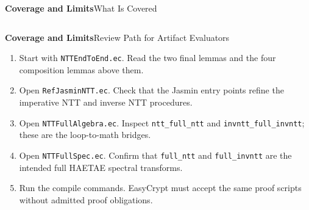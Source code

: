 \documentclass[10pt,aspectratio=1610,compress,dvipsnames]{beamer}
\newcommand{\ec}[1]{\texttt{#1}}
\begin{document}
\begin{frame}{\bfseries Coverage and Limits}{What Is Covered}
\begin{columns}[T]

\end{columns}
\end{frame}

\begin{frame}{\bfseries Coverage and Limits}{Review Path for Artifact Evaluators}
\begin{enumerate}
  \setlength\itemsep{9pt}
  \item Start with \ec{NTTEndToEnd.ec}.  Read the two final lemmas and the four composition lemmas above them.
  \item Open \ec{RefJasminNTT.ec}.  Check that the Jasmin entry points refine the imperative NTT and inverse NTT procedures.
  \item Open \ec{NTTFullAlgebra.ec}.  Inspect \ec{ntt\_full\_ntt} and \ec{invntt\_full\_invntt}; these are the loop-to-math bridges.
  \item Open \ec{NTTFullSpec.ec}.  Confirm that \ec{full\_ntt} and \ec{full\_invntt} are the intended full HAETAE spectral transforms.
  \item Run the compile commands.  EasyCrypt must accept the same proof scripts without admitted proof obligations.
\end{enumerate}
\end{frame}
\end{document}
